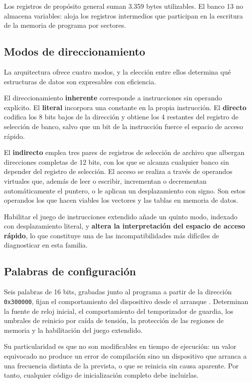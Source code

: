 Los registros de propósito general suman 3.359 bytes utilizables. El banco 13 no
almacena variables: aloja los registros intermedios que participan en la
escritura de la memoria de programa por sectores.

\subsection{Modos de direccionamiento}

La arquitectura ofrece cuatro modos, y la elección entre ellos determina qué
estructuras de datos son expresables con eficiencia.

El direccionamiento \textbf{inherente} corresponde a instrucciones sin operando
explícito. El \textbf{literal} incorpora una constante en la propia instrucción.
El \textbf{directo} codifica los 8 bits bajos de la dirección y obtiene los
4 restantes del registro de selección de banco, salvo que un bit de la
instrucción fuerce el espacio de acceso rápido.

El \textbf{indirecto} emplea tres pares de registros de selección de archivo que
albergan direcciones completas de 12 bits, con los que se alcanza cualquier
banco sin depender del registro de selección. El acceso se realiza a través de
operandos virtuales que, además de leer o escribir, incrementan o decrementan
automáticamente el puntero, o le aplican un desplazamiento con signo. Son estos
operandos los que hacen viables los vectores y las tablas en memoria de datos.

Habilitar el juego de instrucciones extendido añade un quinto modo, indexado con
desplazamiento literal, y \textbf{altera la interpretación del espacio de acceso
rápido}, lo que constituye una de las incompatibilidades más difíciles de
diagnosticar en esta familia.

\subsection{Palabras de configuración}

Seis palabras de 16 bits, grabadas junto al programa a partir de la dirección
\texttt{0x300000}, fijan el comportamiento del dispositivo desde el arranque
\cite{microchip2024ds40002043}. Determinan la fuente de reloj inicial, el
comportamiento del temporizador de guardia, los umbrales de reinicio por caída de
tensión, la protección de las regiones de memoria y la habilitación del juego
extendido.

Su particularidad es que no son modificables en tiempo de ejecución: un valor
equivocado no produce un error de compilación sino un dispositivo que arranca a
una frecuencia distinta de la prevista, o que se reinicia sin causa aparente. Por
tanto, cualquier código de inicialización completo debe incluirlas.


